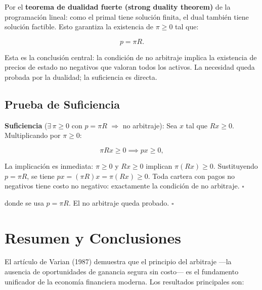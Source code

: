 \documentclass[12pt]{article}
\begin{document}
Por el \textbf{teorema de dualidad fuerte (strong duality theorem)} de la programaci\'on lineal: como el primal tiene soluci\'on finita, el dual tambi\'en tiene soluci\'on factible. Esto garantiza la existencia de $\pi \geq 0$ tal que:

\begin{equation}
  p = \pi R.
  \label{eq:pigualapiR}
\end{equation}

\begin{intuicionmat}
Esta es la conclusi\'on central: la condici\'on de no arbitraje implica la existencia de precios de estado no negativos que valoran todos los activos. La necesidad queda probada por la dualidad; la suficiencia es directa.
\end{intuicionmat}

\subsection{Prueba de Suficiencia}

\textbf{Suficiencia} ($\exists\, \pi \geq 0$ con $p = \pi R$ $\Rightarrow$ no arbitraje): Sea $x$ tal que $Rx \geq 0$. Multiplicando por $\pi \geq 0$:

\begin{equation}
  \pi R x \geq 0 \implies px \geq 0,
  \label{eq:suficiencia}
\end{equation}

\begin{intuicionmat}
La implicaci\'on es inmediata: $\pi \geq 0$ y $Rx \geq 0$ implican $\pi(Rx) \geq 0$. Sustituyendo $p = \pi R$, se tiene $px = (\pi R)x = \pi(Rx) \geq 0$. Toda cartera con pagos no negativos tiene costo no negativo: exactamente la condici\'on de no arbitraje. $\square$
\end{intuicionmat}

donde se usa $p = \pi R$. El no arbitraje queda probado. $\square$

\section{Resumen y Conclusiones}

El art\'iculo de Varian (1987) demuestra que el principio del arbitraje ---la ausencia de oportunidades de ganancia segura sin costo--- es el fundamento unificador de la econom\'ia financiera moderna. Los resultados principales son:
\end{document}
